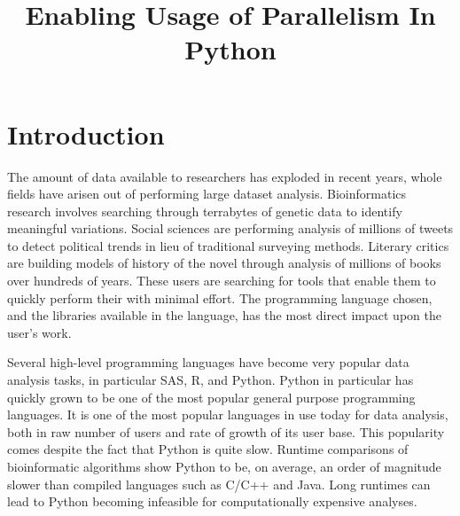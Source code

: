 \documentclass[conference]{IEEEtran}
\begin{document}
\title{Enabling Usage of Parallelism In Python}
\author{
}

\maketitle

\begin{abstract}

\end{abstract}

\section{Introduction}


The amount of data available to researchers has exploded in recent years, 
whole fields have arisen out of performing large dataset analysis.
Bioinformatics research involves searching through terrabytes of genetic data
to identify meaningful variations.\cite{bolstad2003comparison}
Social sciences are performing analysis of millions of tweets to detect political trends in lieu of traditional surveying methods. 
\cite{cody2016public}
Literary critics are building models of history of the novel through analysis of millions of books over hundreds of years.\cite{moretti2005graphs}
These users are searching for tools that enable them to quickly perform their 
with minimal effort.
The programming language chosen, and the libraries available in the language, 
has the most direct impact upon the user's work.

Several high-level programming languages have become very popular data analysis tasks, in particular SAS, R, and Python.\cite{kdnuggetSurvey}
Python in particular has quickly grown to be one of the most popular general purpose programming languages.
It is one of the most popular languages in use today for data 
analysis, both in raw number of users\cite{kdnuggetSurvey} and rate 
of growth of its user base.\cite{kdnuggetGrowthSurvey}
This popularity comes despite the fact that Python is quite slow.
Runtime comparisons of bioinformatic algorithms
show Python to be, on average, an order of magnitude slower than 
compiled languages such as C/C++ and Java.\cite{fourment2008comparison}
Long runtimes can lead to Python becoming infeasible
for computationally expensive analyses.
\end{document}
